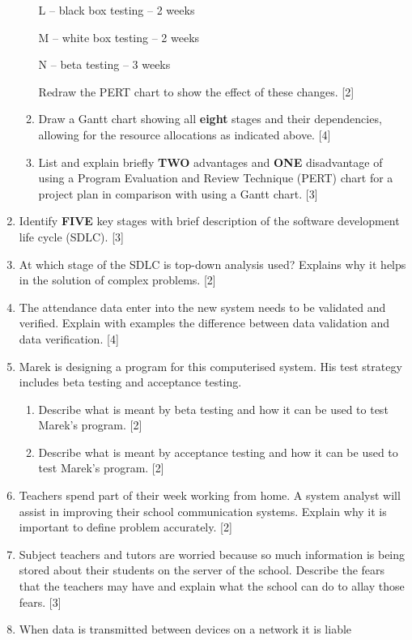 \begin{enumerate}
\begin{enumerate}
L -- black box testing -- 2 weeks 

M -- white box testing -- 2 weeks

N -- beta testing -- 3 weeks 

Redraw the PERT chart to show the effect of these changes.\hfill{}
{[}2{]}
\item Draw a Gantt chart showing all \textbf{eight} stages and their dependencies,
allowing for the resource allocations as indicated above. \hfill{}{[}4{]}
\item List and explain briefly \textbf{TWO} advantages and \textbf{ONE}
disadvantage of using a Program Evaluation and Review Technique (PERT)
chart for a project plan in comparison with using a Gantt chart. \hfill{}{[}3{]}
\end{enumerate}
\item Identify \textbf{FIVE} key stages with brief description of the software
development life cycle (SDLC). \hfill{}{[}3{]}
\item At which stage of the SDLC is top-down analysis used? Explains why
it helps in the solution of complex problems. \hfill{}{[}2{]}
\item The attendance data enter into the new system needs to be validated
and verified. Explain with examples the difference between data validation
and data verification. \hfill{}{[}4{]}
\item Marek is designing a program for this computerised system. His test
strategy includes beta testing and acceptance testing.
\begin{enumerate}
\item Describe what is meant by beta testing and how it can be used to test
Marek\textquoteright s program. \hfill{} {[}2{]}
\item Describe what is meant by acceptance testing and how it can be used
to test Marek\textquoteright s program. \hfill{}{[}2{]}
\end{enumerate}
\item Teachers spend part of their week working from home. A system analyst
will assist in improving their school communication systems. Explain
why it is important to define problem accurately. {[}2{]} 
\item Subject teachers and tutors are worried because so much information
is being stored about their students on the server of the school.
Describe the fears that the teachers may have and explain what the
school can do to allay those fears. \hfill{}{[}3{]}
\item When data is transmitted between devices on a network it is liable

\end{enumerate}
